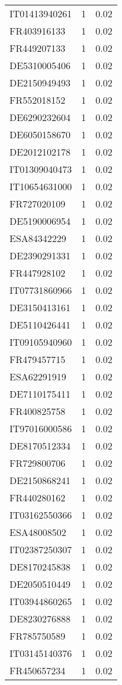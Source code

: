 \begin{table*}[htbp]
\begin{tabular}{lrr}
IT01413940261 & 1 & 0.02 \\
FR403916133 & 1 & 0.02 \\
FR449207133 & 1 & 0.02 \\
DE5310005406 & 1 & 0.02 \\
DE2150949493 & 1 & 0.02 \\
FR552018152 & 1 & 0.02 \\
DE6290232604 & 1 & 0.02 \\
DE6050158670 & 1 & 0.02 \\
DE2012102178 & 1 & 0.02 \\
IT01309040473 & 1 & 0.02 \\
IT10654631000 & 1 & 0.02 \\
FR727020109 & 1 & 0.02 \\
DE5190006954 & 1 & 0.02 \\
ESA84342229 & 1 & 0.02 \\
DE2390291331 & 1 & 0.02 \\
FR447928102 & 1 & 0.02 \\
IT07731860966 & 1 & 0.02 \\
DE3150413161 & 1 & 0.02 \\
DE5110426441 & 1 & 0.02 \\
IT09105940960 & 1 & 0.02 \\
FR479457715 & 1 & 0.02 \\
ESA62291919 & 1 & 0.02 \\
DE7110175411 & 1 & 0.02 \\
FR400825758 & 1 & 0.02 \\
IT97016000586 & 1 & 0.02 \\
DE8170512334 & 1 & 0.02 \\
FR729800706 & 1 & 0.02 \\
DE2150868241 & 1 & 0.02 \\
FR440280162 & 1 & 0.02 \\
IT03162550366 & 1 & 0.02 \\
ESA48008502 & 1 & 0.02 \\
IT02387250307 & 1 & 0.02 \\
DE8170245838 & 1 & 0.02 \\
DE2050510449 & 1 & 0.02 \\
IT03944860265 & 1 & 0.02 \\
DE8230276888 & 1 & 0.02 \\
FR785750589 & 1 & 0.02 \\
IT03145140376 & 1 & 0.02 \\
FR450657234 & 1 & 0.02 \\

\end{tabular}
\end{table*}
